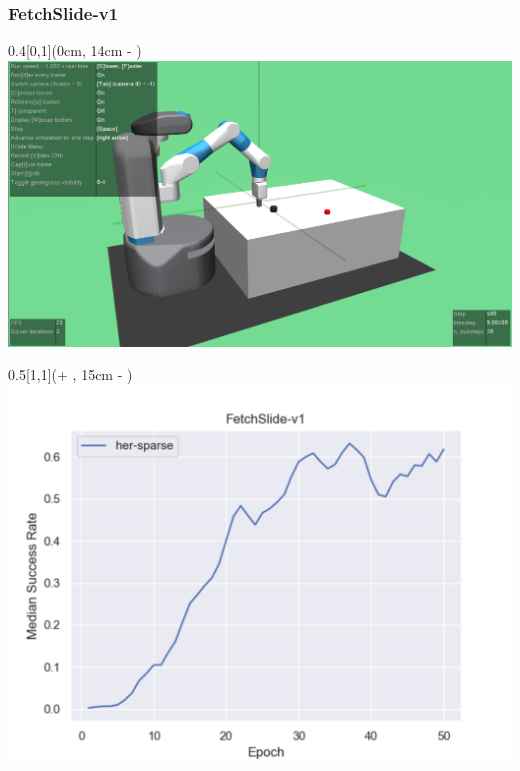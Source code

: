 


\begin{frame}
	\frametitle{FetchSlide-v1}	
	\vspace{1cm}
	
	\begin{textblock*}{0.4\paperwidth}[0,1](0cm, 14cm - \PraesentationSeitenrand)%
		\includegraphics[width=0.4\paperwidth]{./Ressourcen/Figures/FetchSlide-v1.pdf}
	\end{textblock*}
	
	\begin{textblock*}{0.5\paperwidth}[1,1](\textwidth + \PraesentationSeitenrand, 15cm - \PraesentationSeitenrand)%
		\includegraphics[width=0.5\paperwidth]{./Ressourcen/Figures/fig_FetchSlide-v1.pdf}
	\end{textblock*}
	
\end{frame}
\clearpage


